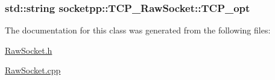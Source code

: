 \hypertarget{classsocketpp_1_1TCP__RawSocket_380529364d9488faf998543d433d8fe6}{
\subsubsection[{TCP\_\-opt}]{\setlength{\rightskip}{0pt plus 5cm}std::string {\bf socketpp::TCP\_\-RawSocket::TCP\_\-opt}}}
\label{classsocketpp_1_1TCP__RawSocket_380529364d9488faf998543d433d8fe6}




The documentation for this class was generated from the following files:\begin{CompactItemize}
\item 
\hyperlink{RawSocket_8h}{RawSocket.h}\item 
\hyperlink{RawSocket_8cpp}{RawSocket.cpp}\end{CompactItemize}

